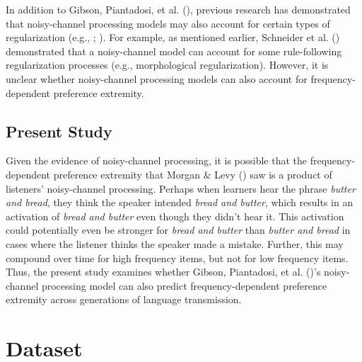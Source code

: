 \documentclass[
  12pt,
  letterpaper,
]{scrreprt}
\begin{document}
In addition to Gibson, Piantadosi, et al.
(),
previous research has demonstrated that noisy-channel processing models
may also account for certain types of regularization (e.g.,
; ). For example, as mentioned earlier, Schneider et al.
() demonstrated that
a noisy-channel model can account for some rule-following regularization
processes (e.g., morphological regularization). However, it is unclear
whether noisy-channel processing models can also account for
frequency-dependent preference extremity.

\subsection{Present Study}\label{present-study-3}

Given the evidence of noisy-channel processing, it is possible that the
frequency-dependent preference extremity that Morgan \& Levy
()
saw is a product of listeners' noisy-channel processing. Perhaps when
learners hear the phrase \emph{butter and bread}, they think the speaker
intended \emph{bread and butter}, which results in an activation of
\emph{bread and butter} even though they didn't hear it. This activation
could potentially even be stronger for \emph{bread and butter} than
\emph{butter and bread} in cases where the listener thinks the speaker
made a mistake. Further, this may compound over time for high frequency
items, but not for low frequency items. Thus, the present study examines
whether Gibson, Piantadosi, et al.
()'s
noisy-channel processing model can also predict frequency-dependent
preference extremity across generations of language transmission.

\section{Dataset}\label{dataset-2}
\end{document}
